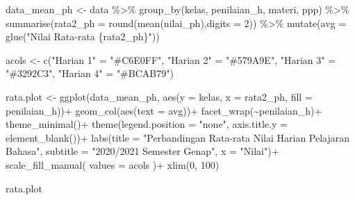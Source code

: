 \documentclass[
]{article}
\newenvironment{Shaded}{\begin{snugshade}}{\end{snugshade}}
\newcommand{\AttributeTok}[1]{\textcolor[rgb]{0.77,0.63,0.00}{#1}}
\newcommand{\DecValTok}[1]{\textcolor[rgb]{0.00,0.00,0.81}{#1}}
\newcommand{\FunctionTok}[1]{\textcolor[rgb]{0.00,0.00,0.00}{#1}}
\newcommand{\NormalTok}[1]{#1}
\newcommand{\OtherTok}[1]{\textcolor[rgb]{0.56,0.35,0.01}{#1}}
\newcommand{\SpecialCharTok}[1]{\textcolor[rgb]{0.00,0.00,0.00}{#1}}
\newcommand{\StringTok}[1]{\textcolor[rgb]{0.31,0.60,0.02}{#1}}
\begin{document}
\begin{Shaded}
\begin{Highlighting}[]
\NormalTok{data\_mean\_ph }\OtherTok{\textless{}{-}}
\NormalTok{  data }\SpecialCharTok{\%\textgreater{}\%} 
  \FunctionTok{group\_by}\NormalTok{(kelas, penilaian\_h, materi, ppp) }\SpecialCharTok{\%\textgreater{}\%} 
  \FunctionTok{summarise}\NormalTok{(}\AttributeTok{rata2\_ph =} \FunctionTok{round}\NormalTok{(}\FunctionTok{mean}\NormalTok{(nilai\_ph),}\AttributeTok{digits =} \DecValTok{2}\NormalTok{)) }\SpecialCharTok{\%\textgreater{}\%} 
  \FunctionTok{mutate}\NormalTok{(}\AttributeTok{avg =} \FunctionTok{glue}\NormalTok{(}\StringTok{"Nilai Rata{-}rata \{rata2\_ph\}"}\NormalTok{))}
\end{Highlighting}
\end{Shaded}

\begin{Shaded}
\begin{Highlighting}[]
\NormalTok{acols }\OtherTok{\textless{}{-}} \FunctionTok{c}\NormalTok{(}\StringTok{"Harian 1"} \OtherTok{=} \StringTok{"\#C6E0FF"}\NormalTok{, }
           \StringTok{"Harian 2"} \OtherTok{=} \StringTok{"\#579A9E"}\NormalTok{,}
           \StringTok{"Harian 3"} \OtherTok{=} \StringTok{"\#3292C3"}\NormalTok{,}
           \StringTok{"Harian 4"} \OtherTok{=} \StringTok{"\#BCAB79"}\NormalTok{)}

\NormalTok{rata.plot }\OtherTok{\textless{}{-}} \FunctionTok{ggplot}\NormalTok{(data\_mean\_ph, }\FunctionTok{aes}\NormalTok{(}\AttributeTok{y =}\NormalTok{ kelas, }\AttributeTok{x =}\NormalTok{ rata2\_ph, }\AttributeTok{fill =}\NormalTok{ penilaian\_h))}\SpecialCharTok{+}
  \FunctionTok{geom\_col}\NormalTok{(}\FunctionTok{aes}\NormalTok{(}\AttributeTok{text =}\NormalTok{ avg))}\SpecialCharTok{+}
  \FunctionTok{facet\_wrap}\NormalTok{(}\SpecialCharTok{\textasciitilde{}}\NormalTok{penilaian\_h)}\SpecialCharTok{+}
  \FunctionTok{theme\_minimal}\NormalTok{()}\SpecialCharTok{+}
  \FunctionTok{theme}\NormalTok{(}\AttributeTok{legend.position =} \StringTok{"none"}\NormalTok{,}
        \AttributeTok{axis.title.y =} \FunctionTok{element\_blank}\NormalTok{())}\SpecialCharTok{+}
  \FunctionTok{labs}\NormalTok{(}\AttributeTok{title =} \StringTok{"Perbandingan Rata{-}rata Nilai Harian Pelajaran Bahasa"}\NormalTok{,}
       \AttributeTok{subtitle =} \StringTok{"2020/2021 Semester Genap"}\NormalTok{,}
       \AttributeTok{x =} \StringTok{"Nilai"}\NormalTok{)}\SpecialCharTok{+}
  \FunctionTok{scale\_fill\_manual}\NormalTok{(}
    \AttributeTok{values =}\NormalTok{ acols      }
\NormalTok{  )}\SpecialCharTok{+}
  \FunctionTok{xlim}\NormalTok{(}\DecValTok{0}\NormalTok{, }\DecValTok{100}\NormalTok{)}

\NormalTok{rata.plot}
\end{Highlighting}
\end{Shaded}
\end{document}
